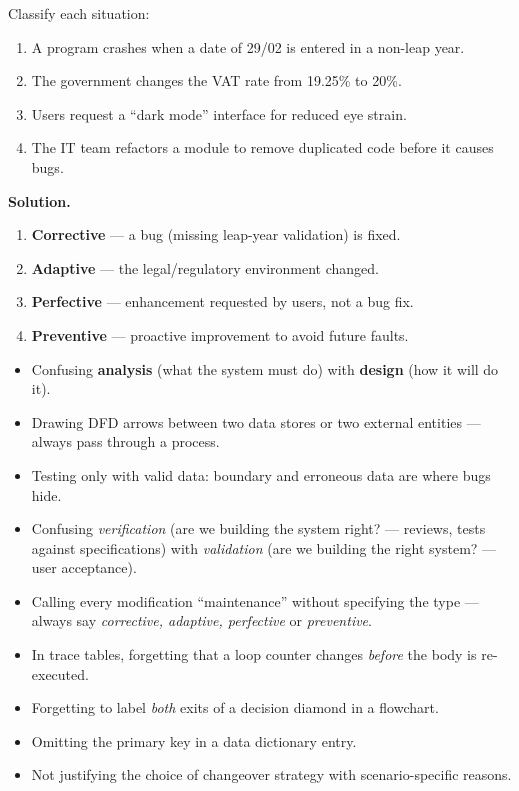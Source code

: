 \documentclass[11pt]{article}
\begin{document}
\begin{exoresolu}
Classify each situation:
\begin{enumerate}
\item A program crashes when a date of 29/02 is entered in a non-leap year.
\item The government changes the VAT rate from 19.25\% to 20\%.
\item Users request a ``dark mode'' interface for reduced eye strain.
\item The IT team refactors a module to remove duplicated code before it causes bugs.
\end{enumerate}
\tcblower
\textbf{Solution.}
\begin{enumerate}
\item \textbf{Corrective} — a bug (missing leap-year validation) is fixed.
\item \textbf{Adaptive} — the legal/regulatory environment changed.
\item \textbf{Perfective} — enhancement requested by users, not a bug fix.
\item \textbf{Preventive} — proactive improvement to avoid future faults.
\end{enumerate}
\end{exoresolu}

\begin{attention}
\begin{itemize}
\item Confusing \textbf{analysis} (what the system must do) with \textbf{design} (how it will do it).
\item Drawing DFD arrows between two data stores or two external entities — always pass through a process.
\item Testing only with valid data: boundary and erroneous data are where bugs hide.
\item Confusing \emph{verification} (are we building the system right? — reviews, tests against specifications) with \emph{validation} (are we building the right system? — user acceptance).
\item Calling every modification ``maintenance'' without specifying the type — always say \emph{corrective, adaptive, perfective} or \emph{preventive}.
\item In trace tables, forgetting that a loop counter changes \emph{before} the body is re-executed.
\item Forgetting to label \emph{both} exits of a decision diamond in a flowchart.
\item Omitting the primary key in a data dictionary entry.
\item Not justifying the choice of changeover strategy with scenario-specific reasons.
\end{itemize}
\end{attention}
\end{document}
